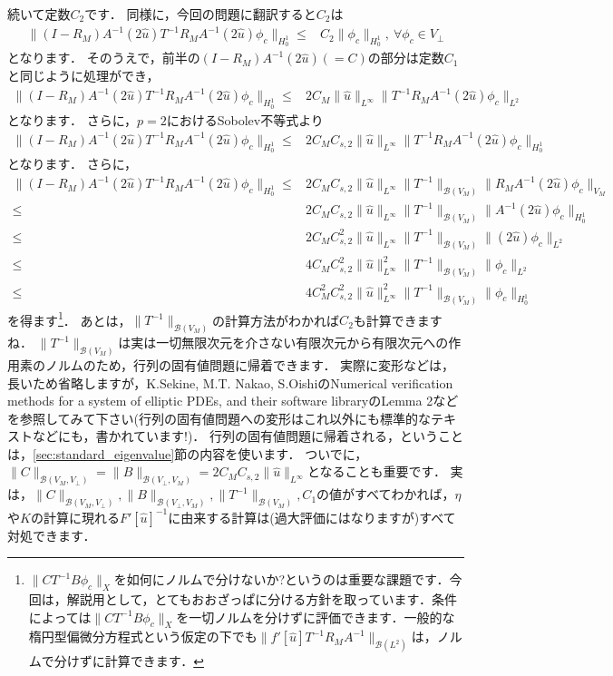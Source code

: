 続いて定数$C_2$です．
同様に，今回の問題に翻訳すると$C_2$は
\begin{align*}
	\| (I - R_M) A^{-1} (2\hat{u}) T^{-1} R_M A^{-1} (2\hat{u}) \phi_c \|_{H^1_0} \le& C_2 \| \phi_c \|_{H^1_0}, ~ \forall \phi_c \in V_\perp
\end{align*}
となります．
そのうえで，前半の$(I - R_M) A^{-1} (2\hat{u}) (=C)$の部分は定数$C_1$と同じように処理ができ，
\begin{align*}
	\| (I - R_M) A^{-1} (2\hat{u}) T^{-1} R_M A^{-1} (2\hat{u}) \phi_c \|_{H^1_0} \le& 2 C_M  \| \hat{u} \|_{L^\infty} \| T^{-1} R_M A^{-1} (2\hat{u}) \phi_c \|_{L^2}
\end{align*}
となります．
さらに，$p=2$におけるSobolev不等式より
\begin{align*}
	\| (I - R_M) A^{-1} (2\hat{u}) T^{-1} R_M A^{-1} (2\hat{u}) \phi_c \|_{H^1_0} \le& 2 C_M C_{s,2}  \| \hat{u} \|_{L^\infty} \| T^{-1} R_M A^{-1} (2\hat{u}) \phi_c \|_{H^1_0}
\end{align*}
となります．
さらに，
\begin{align*}
	\| (I - R_M) A^{-1} (2\hat{u}) T^{-1} R_M A^{-1} (2\hat{u}) \phi_c \|_{H^1_0} \le& 2 C_M C_{s,2}  \| \hat{u} \|_{L^\infty} \| T^{-1} \|_{{\mathcal B}(V_M)} \| R_M A^{-1} (2\hat{u}) \phi_c \|_{V_M} \\
	\le& 2 C_M C_{s,2}  \| \hat{u} \|_{L^\infty} \| T^{-1} \|_{{\mathcal B}(V_M)} \|  A^{-1} (2\hat{u}) \phi_c \|_{H^1_0} \\
	\le& 2 C_M C_{s,2}^2  \| \hat{u} \|_{L^\infty} \| T^{-1} \|_{{\mathcal B}(V_M)} \|  (2\hat{u}) \phi_c \|_{L^2} \\
	\le& 4 C_M C_{s,2}^2  \| \hat{u} \|_{L^\infty}^2 \| T^{-1} \|_{{\mathcal B}(V_M)} \| \phi_c \|_{L^2} \\
	\le& 4 C_M^2 C_{s,2}^2  \| \hat{u} \|_{L^\infty}^2 \| T^{-1} \|_{{\mathcal B}(V_M)} \| \phi_c \|_{H^1_0}
\end{align*}
を得ます\footnote{$\| CT^{-1}B \phi_c \|_{X}$を如何にノルムで分けないか?というのは重要な課題です．今回は，解説用として，とてもおおざっぱに分ける方針を取っています．条件によっては$\| CT^{-1}B \phi_c \|_{X}$を一切ノルムを分けずに評価できます．一般的な楕円型偏微分方程式という仮定の下でも$\| f'[\hat{u}] T^{-1} R_M A^{-1} \|_{{\mathcal B}(L^2)}$は，ノルムで分けずに計算できます．}．
あとは，$\| T^{-1} \|_{ {\mathcal B}(V_M)}$の計算方法がわかれば$C_2$も計算できますね．
$\| T^{-1} \|_{ {\mathcal B}(V_M)}$は実は一切無限次元を介さない有限次元から有限次元への作用素のノルムのため，行列の固有値問題に帰着できます．
実際に変形などは，長いため省略しますが，K.Sekine, M.T. Nakao, S.OishiのNumerical verification methods for a system of elliptic PDEs, and their software libraryのLemma 2などを参照してみて下さい(行列の固有値問題への変形はこれ以外にも標準的なテキストなどにも，書かれています!)．
行列の固有値問題に帰着される，ということは，\ref{sec:standard_eigenvalue}節の内容を使います．
ついでに，$\| C \|_{ {\mathcal B}(V_M, V_\perp) } = \| B \|_{ {\mathcal B}(V_\perp, V_M) } = 2 C_M C_{s,2}  \| \hat{u} \|_{L^\infty}$となることも重要です．
実は，$\| C \|_{ {\mathcal B}(V_M, V_\perp) }, \| B \|_{ {\mathcal B}(V_\perp, V_M) }, \| T^{-1} \|_{ {\mathcal B}(V_M) }, C_1$の値がすべてわかれば，$\eta$や$K$の計算に現れる$F'[\hat{u}]^{-1}$に由来する計算は(過大評価にはなりますが)すべて対処できます．

